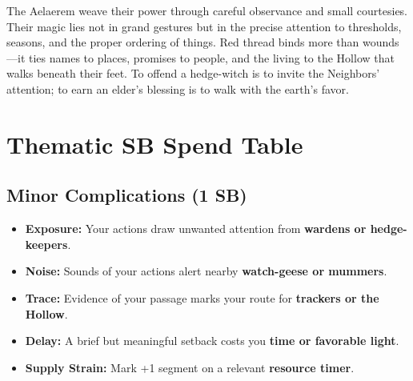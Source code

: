\begin{tcolorbox}[colback=black!3,colframe=black!40!white,title={Hearth Magic},breakable]
The Aelaerem weave their power through careful observance and small courtesies. Their magic lies not in grand gestures but in the precise attention to thresholds, seasons, and the proper ordering of things. Red thread binds more than wounds---it ties names to places, promises to people, and the living to the Hollow that walks beneath their feet. To offend a hedge-witch is to invite the Neighbors' attention; to earn an elder's blessing is to walk with the earth's favor.
\end{tcolorbox}


\section*{Thematic SB Spend Table}
\label{sec:aelaerem-sb}

\subsection*{Minor Complications (1 SB)}
\begin{itemize}
\item \textbf{Exposure:} Your actions draw unwanted attention from \textbf{wardens or hedge-keepers}.
\item \textbf{Noise:} Sounds of your actions alert nearby \textbf{watch-geese or mummers}.
\item \textbf{Trace:} Evidence of your passage marks your route for \textbf{trackers or the Hollow}.
\item \textbf{Delay:} A brief but meaningful setback costs you \textbf{time or favorable light}.
\item \textbf{Supply Strain:} Mark +1 segment on a relevant \textbf{resource timer}.
\end{itemize}

